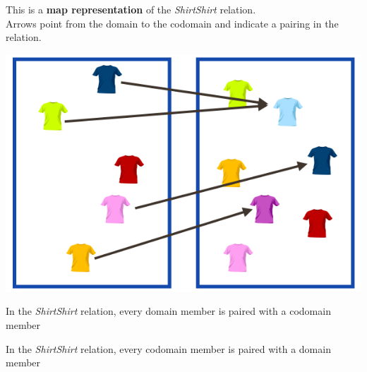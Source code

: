 \documentclass{ximera}
\author{Lee Wayand}
\begin{document}
\begin{exercise}

This is a \textbf{map representation} of the \textit{ShirtShirt} relation. \\


Arrows point from the domain to the codomain and indicate a pairing in the relation.


\begin{image}
\includegraphics{../../pics/func_maps/f_8.png}
\end{image}




\begin{question} 
In the \textit{ShirtShirt} relation, every domain member is paired with a codomain member

\begin{multipleChoice}
\end{multipleChoice}
\end{question}







\begin{question} 
In the \textit{ShirtShirt} relation, every codomain member is paired with a domain member

\begin{multipleChoice}
\end{multipleChoice}
\end{question}








\end{exercise}
\end{document}
